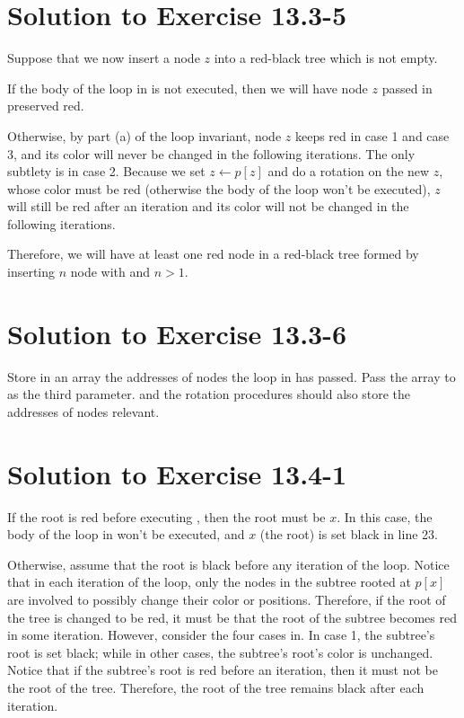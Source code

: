 \documentclass[a4paper, fleqn]{article}
\begin{document}
\section*{Solution to Exercise 13.3-5}

Suppose that we now insert a node $z$ into a red-black tree which is
not empty.

If the body of the  loop in  is not
executed, then we will have node $z$ passed in preserved red.

Otherwise, by part (a) of the loop invariant, node $z$ keeps red in
case 1 and case 3, and its color will never be changed in the
following iterations. The only subtlety is in case 2. Because we set
$z \gets p[z]$ and do a rotation on the new $z$, whose color must be
red (otherwise the body of the  loop won't be executed), $z$
will still be red after an iteration and its color will not be changed
in the following iterations.

Therefore, we will have at least one red node in a red-black tree
formed by inserting $n$ node with  and $n > 1$.




\section*{Solution to Exercise 13.3-6}

Store in an array the addresses of nodes the  loop in
 has passed. Pass the array to 
as the third parameter.  and the rotation
procedures should also store the addresses of nodes relevant.





\section*{Solution to Exercise 13.4-1}

If the root is red before executing , then the
root must be $x$. In this case, the body of the  loop in
 won't be executed, and $x$ (the root) is set
black in line 23.

Otherwise, assume that the root is black before any iteration of the
 loop. Notice that in each iteration of the  loop,
only the nodes in the subtree rooted at $p[x]$ are involved to
possibly change their color or positions. Therefore, if the root of
the tree is changed to be red, it must be that the root of the subtree
becomes red in some iteration. However, consider the four cases in. In
case 1, the subtree's root is set black; while in other cases, the
subtree's root's color is unchanged. Notice that if the subtree's root
is red before an iteration, then it must not be the root of the
tree. Therefore, the root of the tree remains black after each
iteration.
\end{document}

